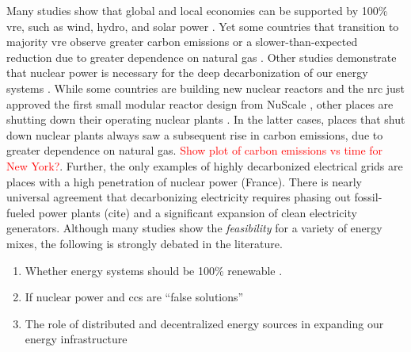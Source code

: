     Many studies show that global and local economies can be supported by 100\% 
    \ac{vre}, such as wind, hydro, and solar power \cite{jacobson_100_2015, bussar_optimal_2014,brown_response_2018,dorotic_integration_2019,wallsgrove_emerging_2021,cochran_la100_2021,cosic_100_2012,traber_economically_2021,bogdanov_full_2021,bogdanov_north-east_2016,esteban_100_2018,yue_least_2020,neumann_near-optimal_2021}. Yet some countries that transition to majority \ac{vre} observe greater carbon emissions or a slower-than-expected reduction due to greater dependence on natural gas \cite{wagner_co2_2021}. Other studies demonstrate that nuclear power is necessary for the deep decarbonization of our energy systems \cite{wagner_co2_2021,dotson_influence_2022,greene_enhancing_2019,kim_carbon_2021,lehtveer_how_2015,de_sisternes_value_2016,alzbutas_uncertainty_2012,brook_why_2014,epiney_economic_2020,petti_future_2018, patrizio_socially_2020}. While some countries are building new nuclear reactors and the \ac{nrc} just approved the first small modular reactor design from
    NuScale \cite{office_of_nuclear_energy_science_and_technology_nrc_2023}, other places are shutting down their operating nuclear plants \cite{johnson_new_2021}. In the latter cases, places that shut down nuclear plants always saw a subsequent rise in carbon emissions, due to greater dependence on natural gas. \textcolor{red}{Show plot of carbon emissions vs time for New York?}. Further, the only examples of highly decarbonized electrical grids are places with a high penetration of nuclear power (France). There is nearly universal agreement that decarbonizing electricity requires phasing out fossil-fueled power plants (cite) and a significant expansion of clean electricity generators. Although many studies show the \textit{feasibility} for a variety of energy mixes, the following is strongly debated in the literature.
    \begin{enumerate}
        \item Whether energy systems should be 100\% renewable \cite{heard_burden_2017, brown_response_2018}.
        \item If nuclear power and \ac{ccs} are ``false solutions'' \cite{elmallah_frontlining_2022, brook_why_2014} 
        \item The role of distributed and decentralized energy sources in expanding our energy infrastructure \cite{pitt_assessing_2015,rinaldi_what_2022,parag_electricity_2016,wang_modeling_2020,morvaj_decarbonizing_2017,gilbert_can_2020,li_economic_2016,falke_multi-objective_2016}
    \end{enumerate}

